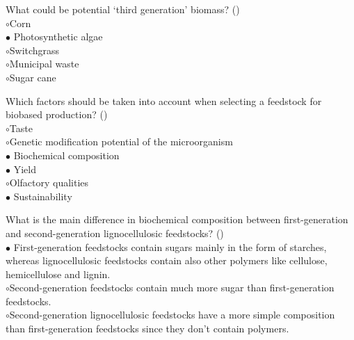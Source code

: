 \documentclass[]{beamer}
\begin{document}
\begin{CJK}{UTF8}{gbsn}
\begin{frame}[shrink] {} 
\addtocounter{questions}{1}
\color{blue}
  What could be potential ‘third generation’ biomass?
 ({})\\
\color{black}
\setlength{\parindent}{-0.4cm}
{\color{red}$\circ$}Corn  \\
{\color{red}$\bullet$} Photosynthetic algae  \\
{\color{red}$\circ$}Switchgrass  \\
{\color{red}$\circ$}Municipal waste  \\
{\color{red}$\circ$}Sugar cane  \\
\end{frame}


\begin{frame}[shrink] {} 
\addtocounter{questions}{1}
\color{blue}
  Which factors should be taken into account when selecting a feedstock for biobased production?
 ({})\\
\color{black}
\setlength{\parindent}{-0.4cm}
{\color{red}$\circ$}Taste  \\
{\color{red}$\circ$}Genetic modification potential of the microorganism  \\
{\color{red}$\bullet$} Biochemical composition  \\
{\color{red}$\bullet$} Yield  \\
{\color{red}$\circ$}Olfactory qualities  \\
{\color{red}$\bullet$} Sustainability  \\
\end{frame}


\begin{frame}[shrink] {} 
\addtocounter{questions}{1}
\color{blue}
  What is the main difference in biochemical composition between first-generation and second-generation lignocellulosic feedstocks? 
 ({})\\
\color{black}
\setlength{\parindent}{-0.4cm}
{\color{red}$\bullet$} First-generation feedstocks contain sugars mainly in the form of starches, whereas lignocellulosic feedstocks contain also other polymers like cellulose, hemicellulose and lignin.   \\
{\color{red}$\circ$}Second-generation feedstocks contain much more sugar than first-generation feedstocks.   \\
{\color{red}$\circ$}Second-generation lignocellulosic feedstocks have a more simple composition than first-generation feedstocks since they don't contain polymers.   \\
\end{frame}



\end{CJK}
\end{document}
